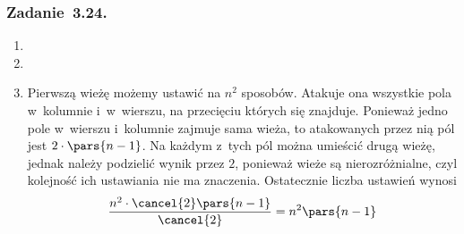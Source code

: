 \subsubsection*{Zadanie~3.24.}
\begin{enumerate}[label={\alph*)}]
    \item
    \item
    \item Pierwszą wieżę możemy ustawić na \(n^2\) sposobów. Atakuje ona wszystkie pola w~kolumnie i~w~wierszu, na przecięciu których się znajduje. Ponieważ jedno pole w~wierszu i~kolumnie zajmuje sama wieża, to atakowanych przez nią pól jest \(2 \cdot \pars{n - 1}\). Na każdym z~tych pól można umieścić drugą wieżę, jednak należy podzielić wynik przez \(2\), ponieważ wieże są nierozróżnialne, czyl kolejność ich ustawiania nie ma znaczenia. Ostatecznie liczba ustawień wynosi
        \begin{equation*}
            \frac{n^2 \cdot \cancel{2}\pars{n - 1}}{\cancel{2}} = n^2\pars{n - 1}
        \end{equation*}
\end{enumerate}

